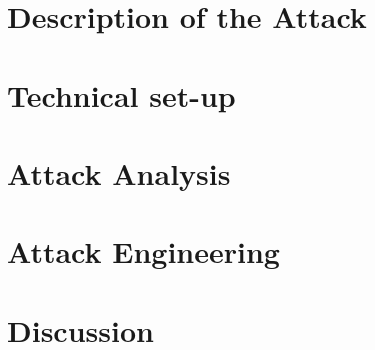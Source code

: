 \documentclass[10pt, a4paper, twocolumn]{article} %
\begin{document}
\section{Description of the Attack}
\label{sec:attack_desc}


\section{Technical set-up}
\label{sec:tech_set_up}


\section{Attack Analysis}
\label{sec:attack_analysis}

%

\section{Attack Engineering}
\label{sec:attack_engineering}


\newpage
\section{Discussion}
\label{sec:discussion}



\printbibliography[title={Bibliography}] %

\end{document}
